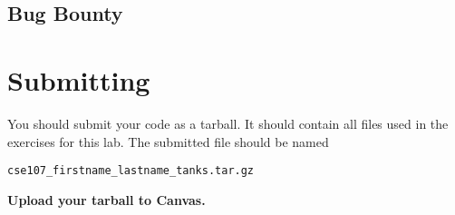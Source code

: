 \documentclass[11pt]{cselabheader}
\begin{document}
\begin{ex}[coward.py]
\end{ex}

\begin{ex}[charger.py]
\end{ex}

\begin{ex}[turret.py]
\end{ex}

\begin{ex}[elephant.py]
\end{ex}

\begin{ex}[mouse.py]
\end{ex}

\begin{ex}[custom.py]
\end{ex}


\subsection{Bug Bounty}


\section{Submitting}
You should submit your code as a tarball. It should contain all files
used in the exercises for this lab. The submitted file should be named
\begin{center}
  \texttt{cse107\_firstname\_lastname\_tanks.tar.gz}
\end{center}

\begin{center}
  \textbf{Upload your tarball to Canvas.}
\end{center}

\listoftheorems
\end{document}
